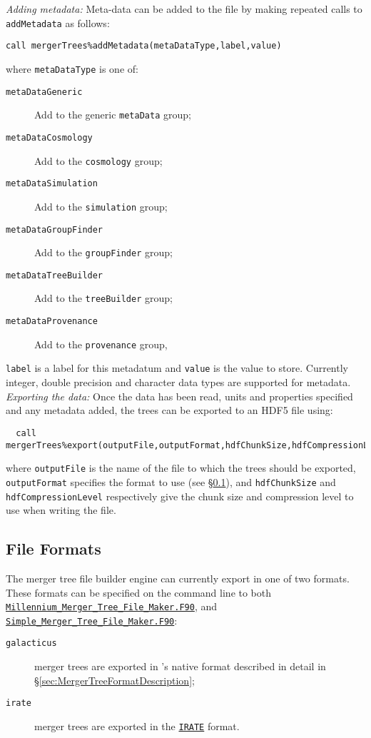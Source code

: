 \noindent \emph{Adding metadata:} Meta-data can be added to the file by making repeated calls to {\tt addMetadata} as follows:
\begin{verbatim}
call mergerTrees%addMetadata(metaDataType,label,value)
\end{verbatim}
where {\tt metaDataType} is one of:
\begin{description}
 \item [{\tt metaDataGeneric}] Add to the generic {\tt metaData} group;
 \item [{\tt metaDataCosmology}] Add to the {\tt cosmology} group;
 \item [{\tt metaDataSimulation}] Add to the {\tt simulation} group;
 \item [{\tt metaDataGroupFinder}] Add to the {\tt groupFinder} group;
 \item [{\tt metaDataTreeBuilder}] Add to the {\tt treeBuilder} group;
 \item [{\tt metaDataProvenance}] Add to the {\tt provenance} group,
\end{description}
{\tt label} is a label for this metadatum and {\tt value} is the value to store. Currently integer, double precision and character data types are supported for metadata.\\

\noindent \emph{Exporting the data:} Once the data has been read, units and properties specified and any metadata added, the trees can be exported to an HDF5 file using:
\begin{verbatim}
  call mergerTrees%export(outputFile,outputFormat,hdfChunkSize,hdfCompressionLevel)
\end{verbatim}
where {\tt outputFile} is the name of the file to which the trees should be exported, {\tt outputFormat} specifies the format to use (see \S\ref{sec:mergerTreeBuilderFileFormats}), and {\tt hdfChunkSize} and {\tt hdfCompressionLevel} respectively give the chunk size and compression level to use when writing the file.

\subsection{File Formats}\label{sec:mergerTreeBuilderFileFormats}

The merger tree file builder engine can currently export in one of two formats. These formats can be specified on the command line to both \hyperlink{Millennium_Merger_Tree_File_Maker.F90}{{\tt Millennium\_Merger\_Tree\_File\_Maker.F90}}, and \hyperlink{Simple_Merger_Tree_File_Maker.F90}{{\tt Simple\_Merger\_Tree\_File\_Maker.F90}}:
\begin{description}
 \item [{\tt galacticus}] merger trees are exported in \glc's native format described in detail in \S\ref{sec:MergerTreeFormatDescription};
 \item [{\tt irate}] merger trees are exported in the \href{https://bitbucket.org/eteq/irate-format}{\tt IRATE} format.
\end{description}

